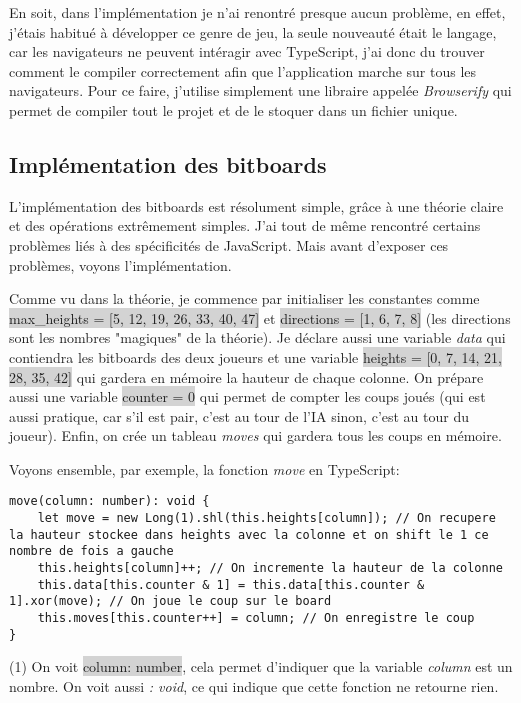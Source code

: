 \documentclass[a4paper]{article}
\newcommand{\inlinecode}[1]{\colorbox{lightgray}{#1}}
\begin{document}
    En soit, dans l'implémentation je n'ai renontré presque aucun problème, en effet, j'étais habitué à développer ce genre de jeu, la seule nouveauté était le langage, car les navigateurs ne peuvent intéragir avec TypeScript, j'ai donc du trouver comment le compiler correctement afin que l'application marche sur tous les navigateurs. Pour ce faire, j'utilise simplement une libraire appelée \textit{Browserify} qui permet de compiler tout le projet et de le stoquer dans un fichier unique.

\subsection{Implémentation des bitboards}

	L'implémentation des bitboards est résolument simple, grâce à une théorie claire et des opérations extrêmement simples. J'ai tout de même rencontré certains problèmes liés à des spécificités de JavaScript. Mais avant d'exposer ces problèmes, voyons l'implémentation.

	Comme vu dans la théorie, je commence par initialiser les constantes comme \newline\inlinecode{max\_heights = [5, 12, 19, 26, 33, 40, 47]} et \inlinecode{directions = [1, 6, 7, 8]} (les directions sont les nombres "magiques" de la théorie). Je déclare aussi une variable \textit{data} qui contiendra les bitboards des deux joueurs et une variable \inlinecode{heights = [0, 7, 14, 21, 28, 35, 42]} qui gardera en mémoire la hauteur de chaque colonne. On prépare aussi une variable \inlinecode{counter = 0} qui permet de compter les coups joués (qui est aussi pratique, car s'il est pair, c'est au tour de l'IA sinon, c'est au tour du joueur). Enfin, on crée un tableau \textit{moves} qui gardera tous les coups en mémoire.

	Voyons ensemble, par exemple, la fonction \textit{move} en TypeScript:
	\begin{lstlisting}
move(column: number): void {
    let move = new Long(1).shl(this.heights[column]); // On recupere la hauteur stockee dans heights avec la colonne et on shift le 1 ce nombre de fois a gauche
    this.heights[column]++; // On incremente la hauteur de la colonne
    this.data[this.counter & 1] = this.data[this.counter & 1].xor(move); // On joue le coup sur le board
    this.moves[this.counter++] = column; // On enregistre le coup
}
	\end{lstlisting}

	(1) On voit \inlinecode{column: number}, cela permet d'indiquer que la variable \textit{column} est un nombre. On voit aussi \textit{: void}, ce qui indique que cette fonction ne retourne rien.
	
\end{document}
